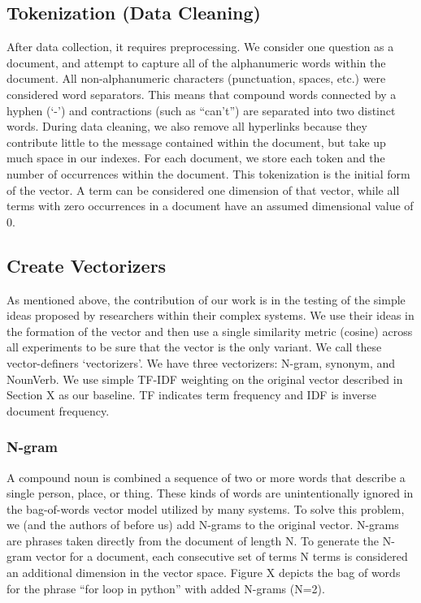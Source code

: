 \documentclass{acm_proc_article-sp}
\begin{document}
\subsection{Tokenization (Data Cleaning)}
After data collection, it requires preprocessing. We consider one question as a document, and attempt to capture all of the alphanumeric words within the document. All non-alphanumeric characters (punctuation, spaces, etc.) were considered word separators. This means that compound words connected by a hyphen (`-’) and contractions (such as ``can’t”) are separated into two distinct words. During data cleaning, we also remove all hyperlinks because they contribute little to the message contained within the document, but take up much space in our indexes. For each document, we store each token and the number of occurrences within the document. This tokenization is the initial form of the vector. A term can be considered one dimension of that vector, while all terms with zero occurrences in a document have an assumed dimensional value of 0.


\subsection{Create Vectorizers}
As mentioned above, the contribution of our work is in the testing of the simple ideas proposed by researchers within their complex systems. We use their ideas in the formation of the vector and then use a single similarity metric (cosine) across all experiments to be sure that the vector is the only variant. We call these vector-definers `vectorizers’. We have three vectorizers: N-gram, synonym, and NounVerb. We use simple TF-IDF weighting on the original vector described in Section X as our baseline. TF indicates term frequency and IDF is inverse document frequency. 

\subsubsection{N-gram}
A compound noun is combined a sequence of two or more words that describe a single person, place, or thing. These kinds of words are unintentionally ignored in the bag-of-words vector model utilized by many systems. To solve this problem, we (and the authors of \cite{millar2006performance} before us) add N-grams to the original vector. N-grams are phrases taken directly from the document of length N.  To generate the N-gram vector for a document, each consecutive set of terms N terms is considered an additional dimension in the vector space. Figure X depicts the bag of words for the phrase ``for loop in python” with added N-grams (N=2).
\end{document}
